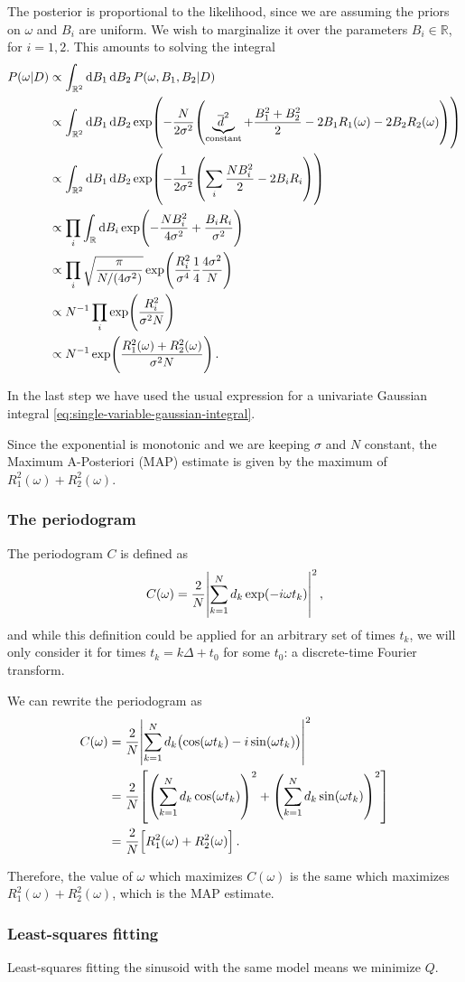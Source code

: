 \documentclass[main.tex]{subfiles}
\begin{document}
The posterior is proportional to the likelihood, since we are assuming the priors on \(\omega \) and \(B_i\) are uniform. 
We wish to marginalize it over the parameters \(B_i \in \mathbb{R}\), for \(i = 1, 2\).
This amounts to solving the integral 
%
\begin{align}
P (\omega | D) &\propto \int_{\mathbb{R}^2} \dd{B_1 } \dd{B_2 } P (\omega , B_1 , B_2  | D)   \\
&\propto \int_{\mathbb{R}^2} \dd{B_1 } \dd{B_2 }
\exp(- \frac{N}{2 \sigma^2} \qty(\underbrace{\overline{d}^2}_{\text{constant}} + \frac{B_1^2 + B_2^2}{2} - 2 B_1 R_1(\omega ) -2  B_2 R_2(\omega )))  \\
&\propto \int_{\mathbb{R}^2} \dd{B_1} \dd{B_2 } \exp(- \frac{1}{2 \sigma^2} \qty( \sum _{i} \frac{N B_i^2}{2} - 2 B_i R_i)) \\
&\propto \prod_i \int_{\mathbb{R}} \dd{B_i}
\exp(- \frac{N B_i^2}{4 \sigma^2} + \frac{B_i R_i}{\sigma^2})  \\
&\propto \prod_i \sqrt{ \frac{\pi}{N / (4 \sigma^2)}}
\exp( \frac{R_i^2}{\sigma^{4}} \frac{1}{4} \frac{4 \sigma^2 }{N})  \\
&\propto N^{-1} \prod_i \exp( \frac{R_i^2}{\sigma^2 N})  \\
&\propto N^{-1} \exp(\frac{R_1^2(\omega ) + R_2^2(\omega )}{\sigma^2 N})
\,.
\end{align}

In the last step we have used the usual expression for a univariate Gaussian integral \eqref{eq:single-variable-gaussian-integral}. 

Since the exponential is monotonic and we are keeping \(\sigma \) and \(N \) constant, the Maximum A-Posteriori (MAP) estimate is given by the maximum of \(R_1^2 (\omega ) + R_2^2 (\omega )\).

\subsubsection{The periodogram}

The periodogram \(C\) is defined as 
%
\begin{align}
C(\omega ) = \frac{2}{N} \abs{\sum _{k=1}^{N} d_k \exp(- i \omega t_k)}^2
\,,
\end{align}
%
and while this definition could be applied for an arbitrary set of times \(t_k\), we will only consider it for times \(t_k = k \Delta  + t_0 \) for some \(t_0 \): a discrete-time Fourier transform. 

We can rewrite the periodogram as 
%
\begin{align}
C(\omega ) &= \frac{2}{N} \abs{\sum _{k=1}^{N} d_k \qty(\cos(\omega t_k) - i \sin(\omega t_k))}^2  \\
&= \frac{2}{N} \qty[ \qty(\sum _{k=1}^{N} d_k \cos(\omega t_k))^2 + \qty(\sum _{k=1}^{N} d_k \sin(\omega t_k))^2]  \\
&= \frac{2}{N} \qty[R_1^2(\omega ) + R_2^2 (\omega )]
\,.
\end{align}

Therefore, the value of \(\omega \) which maximizes \(C(\omega )\) is the same which maximizes \(R_1^2 (\omega ) + R_2^2 (\omega )\), which is the MAP estimate. 

\subsubsection{Least-squares fitting}

Least-squares fitting the sinusoid with the same model means we minimize \(Q\). 
\end{document}
